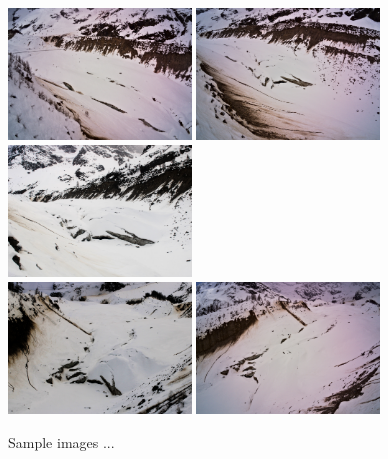 \begin{figure}
  \centering
    \includegraphics[height=3.5cm]{winter_img_1}
    \includegraphics[height=3.5cm]{winter_img_2}
    \includegraphics[height=3.5cm]{winter_img_3} \\ \vspace{1mm}
    \includegraphics[height=3.5cm]{winter_img_4}
    \includegraphics[height=3.5cm]{winter_img_5}
  \caption{Sample images ...}
  \label{fig:5:castle_img}
\end{figure}


